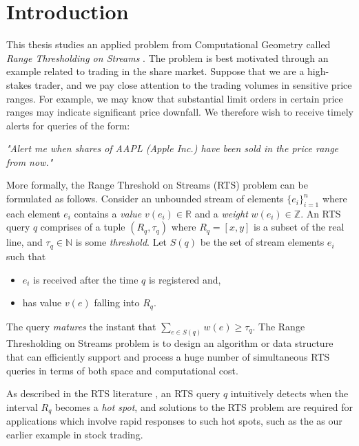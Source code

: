 \clearpage

\def\chaptertitle{Introduction}

\lhead{\emph{\chaptertitle}}

\chapter{\chaptertitle}
\label{ch:introduction}

This thesis studies an applied problem from Computational Geometry called \textit{Range Thresholding on Streams} \cite{GAN16}. The problem is best motivated through an example related to trading in the share market. Suppose that we are a high-stakes trader, and we pay close attention to the trading volumes in sensitive price ranges. For example, we may know that substantial limit orders in certain price ranges may indicate significant price downfall. We therefore wish to receive timely alerts for queries of the form: 

\textit{"Alert me when  shares of AAPL (Apple Inc.) have been sold in the price range \text{[200, 205]} from now."}

More formally, the Range Threshold on Streams (RTS) problem can be formulated as follows. Consider an unbounded stream of elements $\{e_i\}^{n}_{i=1}$ where each element $e_i$ contains a \textit{value} $v(e_i) \in \mathbb{R}$ and a \textit{weight} $w(e_i) \in \mathbb{Z}$. An RTS query $q$ comprises of a tuple $(R_q, \tau_q)$ where $R_q = [x,y]$ is a subset of the real line, and $\tau_q \in\mathbb{N}$ is some \textit{threshold}. Let $S(q)$ be the set of stream elements $e_i$ such that 
\begin{itemize}
    \item $e_i$ is received after the time $q$ is registered and,
    \item has value $v(e)$ falling into $R_q$. 
\end{itemize}
The query \textit{matures} the instant that $\sum_{e\in S(q)}w(e)\geq \tau_q$. The Range Thresholding on Streams problem is to design an algorithm or data structure that can efficiently support and process a huge number of simultaneous RTS queries  in terms of both space and computational cost. 

As described in the RTS literature \cite{GAN16, DBLP:conf/sigmod/ZhangGBKCZ22}, an RTS query $q$ intuitively detects when the interval $R_q$ becomes a \textit{hot spot}, and solutions to the RTS problem are required for applications which involve rapid responses to such hot spots, such as the as our earlier example in stock trading.

